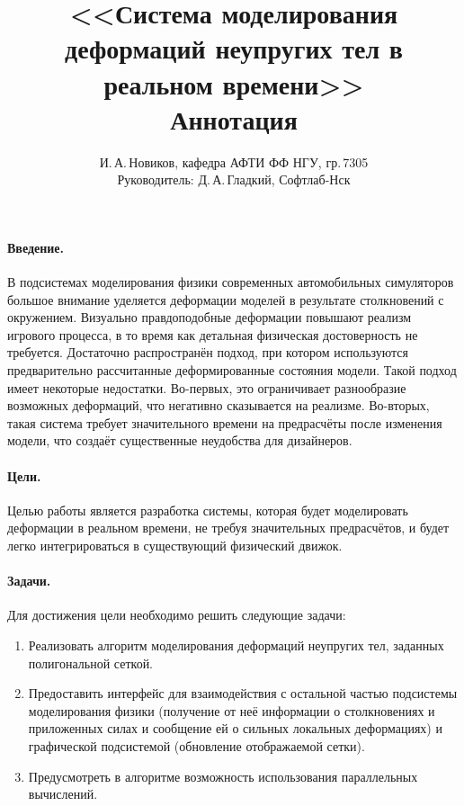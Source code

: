 \documentclass[a4paper,11pt]{article}
\author{И.\,А.\,Новиков, кафедра АФТИ ФФ НГУ, гр.\,7305\\ Руководитель: Д.\,А.\,Гладкий, Софтлаб-Нск}
\title{<<Система моделирования деформаций неупругих тел в реальном времени>>\\ Аннотация}
\begin{document}
  \maketitle
  \thispagestyle{empty}
  \paragraph{Введение.}
    В подсистемах моделирования физики современных автомобильных симуляторов большое внимание
    уделяется деформации моделей в результате столкновений с окружением. Визуально
    правдоподобные деформации повышают реализм игрового процесса, в то время как детальная
    физическая достоверность не требуется. Достаточно распространён подход, при
    котором используются предварительно рассчитанные деформированные состояния модели.
    Такой подход имеет некоторые недостатки.
    Во-первых, это ограничивает разнообразие возможных деформаций, что негативно сказывается на
    реализме.  Во-вторых, такая система требует значительного времени на предрасчёты после изменения
    модели, что создаёт существенные неудобства для дизайнеров.
  \paragraph{Цели.}
    Целью работы является разработка системы, которая будет моделировать деформации в реальном
    времени, не требуя значительных предрасчётов, и будет легко интегрироваться в существующий
    физический движок.
  \paragraph{Задачи.}
    Для достижения цели необходимо решить следующие задачи:
    \begin{enumerate}
      \item Реализовать алгоритм моделирования деформаций неупругих тел, заданных полигональной сеткой.
      \item Предоставить интерфейс для взаимодействия с остальной частью подсистемы моделирования
        физики (получение от неё информации о столкновениях и приложенных силах и сообщение ей о
        сильных локальных деформациях) и графической подсистемой (обновление отображаемой сетки).
      \item Предусмотреть в алгоритме возможность использования параллельных вычислений.
    \end{enumerate}
\end{document}
